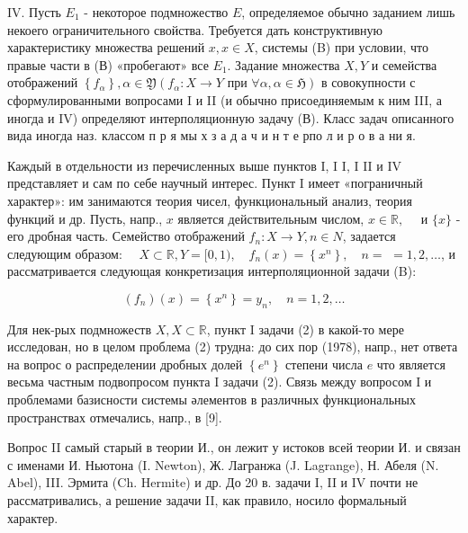 \documentclass[10pt]{article}
\begin{document}
IV. Пусть $E_{1}$ - некоторое подмножество $E$, определяемое обычно заданием лишь некоего ограничительного свойства. Требуется дать конструктивную характеристику множества решений $x, x \in X$, системы (B) при условии, что правые части в (В) «пробегают» все $E_{1}$. Задание множества $X, Y$ и семейства отображений $\left\{f_{\alpha}\right\}, \alpha \in \mathfrak{Y}\left(f_{\alpha}: X \rightarrow Y\right.$ при $\left.\forall \alpha, \alpha \in \mathfrak{H}\right)$ в совокупности с сформулированными вопросами I и II (и обычно присоединяемым к ним III, а иногда и IV) определяют интерполяционную задачу (В). Класс задач описанного вида иногда наз. классом п р я мы х з а д а ч и н т е рпо л и р о в а ни я.



Каждый в отдельности из перечисленных выше пунктов I, I I, I II и IV представляет и сам по себе научный интерес. Пункт I имеет «пограничный характер»: им занимаются теория чисел, функциональный анализ, теория функций и др. Пусть, напр., $x$ является действительным числом, $x \in \mathbb{R}, \quad$ и $\{x\}$ - его дробная часть. Семейство отображений $f_{n}: X \rightarrow Y, n \in N$, задается следующим образом: $\quad X \subset \mathbb{R}, Y=[0,1), \quad f_{n}(x)=\left\{x^{n}\right\}, \quad n=$ $=1,2, \ldots$, и рассматривается следующая конкретизация интерполяционной задачи (B):



\[

\left(f_{n}\right)(x)=\left\{x^{n}\right\}=y_{n}, \quad n=1,2, \ldots

\]



Для нек-рых подмножеств $X, X \subset \mathbb{R}$, пункт I задачи (2) в какой-то мере исследован, но в целом проблема (2) трудна: до сих пор (1978), напр., нет ответа на вопрос о распределении дробных долей $\left\{e^{n}\right\}$ степени числа $e$ что является весьма частным подвопросом пункта I задачи (2). Связь между вопросом I и проблемами базисности системы әлементов в различных функциональных пространствах отмечались, напр., в [9].



Вопрос II самый старый в теории И., он лежит у истоков всей теории И. и связан с именами И. Ньютона (I. Newton), Ж. Лагранжа (J. Lagrange), Н. Абеля (N. Abel), III. Эрмита (Ch. Hermite) и др. До 20 в. задачи I, II и IV почти не рассматривались, а решение задачи II, как правило, носило формальный характер.
\end{document}
